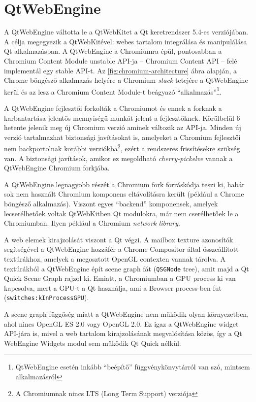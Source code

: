 \documentclass[12pt]{report}
\begin{document}
\section{QtWebEngine}
A QtWebEngine \cite{bib:qt-doc-qtwebengine-overview} váltotta le a QtWebKitet a Qt
keretrendszer 5.4-es verziójában. A célja megegyezik a QtWebKitével: webes tartalom
integrálása és manipulálása Qt alkalmazásban. A QtWebEngine a Chromiumra épül, pontosabban a
Chromium Content Module unstable API-ja -- Chromium Content API -- felé implementál egy
stable API-t. Az \ref{fig:chromium-architecture} ábra alapján, a Chrome böngésző alkalmazás
helyére a Chromium \textit{stack} tetejére a QtWebEngine kerül és az lesz a Chromium Content
Module-t beágyazó ``alkalmazás''\footnote{QtWebEngine esetén inkább ``beépítő''
függvénykönvytárról van szó, mintsem alkalmazásról}.

A QtWebEngine fejlesztői forkolták a Chromiumot és ennek a forknak a karbantartása jelentős
mennyiségű munkát jelent a fejlesztőknek. Körülbelül 6 hetente jelenik meg új Chromium
verzió aminek változik az API-ja. Minden új verzió tartalmazhat biztonsági javításokat is,
amelyeket a Chromium fejlesztői nem backportolnak korábbi verziókba\footnote{A Chromiumnak
nincs LTS (Long Term Support) verziója}, ezért a rendszeres frissítésekre szükség van.
A biztonsági javítások, amikor ez megoldható \textit{cherry-pickelve} vannak a QtWebEngine
Chromium forkjába.

A QtWebEngine legnagyobb részét a Chromium fork forráskódja teszi ki, habár sok
nem használt Chromium komponens eltávolításra került (például a Chrome böngésző alkalmazás).
Viszont egyes ``backend'' komponensek, amelyek lecserélhetőek voltak QtWebKitben Qt modulokra,
már nem cserélhetőek le a Chromiumban. Ilyen például a Chromium \textit{network library}.

A web elemek kirajzolását viszont a Qt végzi. A mailbox texture azonosítók segítségével a
QtWebEngine hozzáfér a Chrome Compositor által összeállított textúrákhoz, amelyek a
megosztott OpenGL contexten vannak tárolva.
A textúrákból a QtWebEngine épít scene graph fát (\texttt{QSGNode} tree), amit majd a
Qt Quick Scene Graph rajzol ki. Emiatt, a Chromiumban a GPU process ki van kapcsolva,
mert a GPU-t a Qt használja, ami a Browser process-ben fut (\texttt{switches:kInProcessGPU}).

A scene graph függőség miatt a QtWebEngine nem működik olyan környezetben, ahol nincs
OpenGL ES 2.0 vagy OpenGL 2.0. Ez igaz a QtWebEngine widget API-jára is, mivel a web tartalom
kirajzolásának megvalósítása közös, így a Qt WebEngine Widgets modul sem működik Qt Quick
nélkül.
\end{document}
